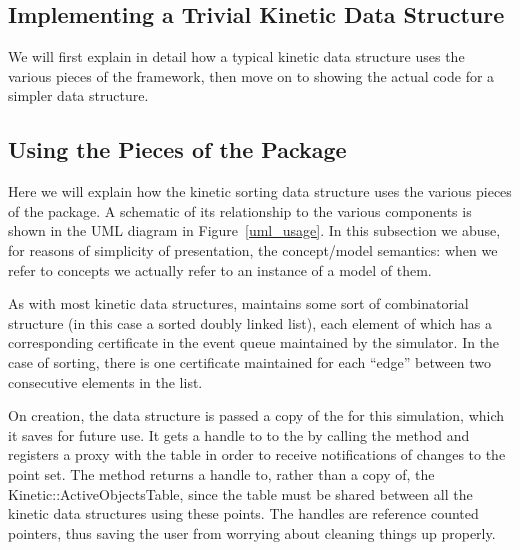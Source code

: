 
\subsection{Implementing a Trivial Kinetic Data Structure}
\label{sec:trivial_kds_example}


We will first explain in detail how a typical kinetic data structure
uses the various pieces of the framework, then move on to showing the
actual code for a simpler data structure.

\subsection{Using the Pieces of the Package}

Here we will explain how the kinetic sorting data structure uses the
various pieces of the package. A schematic of its relationship to the
various components is shown in the UML diagram in
Figure~\ref{uml_usage}. In this subsection we abuse, for reasons of
simplicity of presentation, the concept/model semantics: when we refer
to concepts we actually refer to an instance of a model of them.

As with most kinetic data structures,  maintains some sort of combinatorial structure (in this
case a sorted doubly linked list), each element of which has a
corresponding certificate in the event queue maintained by the
simulator. In the case of sorting, there is one certificate maintained
for each ``edge'' between two consecutive elements in the list.

On creation, the data structure is passed a copy of the
 for this simulation, which it saves for
future use. It gets a handle to to the
 by calling the
method and registers a proxy with the table in order to receive
notifications of changes to the point set.  The
 method returns a handle to, rather
than a copy of, the Kinetic::ActiveObjectsTable, since the table must
be shared between all the kinetic data structures using these points.
The handles are reference counted pointers, thus saving the user from
worrying about cleaning things up properly.

